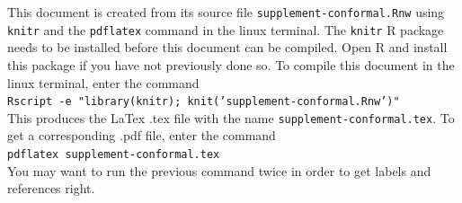 \documentclass[11pt]{article}\usepackage[]{graphicx}\usepackage[]{color}
\begin{document}
This document is created from its source file 
\texttt{supplement-conformal.Rnw} using \texttt{knitr} and the 
\texttt{pdflatex} command in the linux terminal. The \texttt{knitr} R package 
needs to be installed before this document can be compiled. Open R and install 
this package if you have not previously done so. To compile this document in 
the linux terminal, enter the command 
\vspace{0.25cm}\\
\texttt{Rscript -e "library(knitr); knit('supplement-conformal.Rnw')"} 
\vspace{0.25cm}\\
This produces the LaTex .tex file with the name 
\texttt{supplement-conformal.tex}. To get a corresponding .pdf file, enter 
the command
\vspace{0.25cm}\\
\texttt{pdflatex supplement-conformal.tex} 
\vspace{0.25cm}\\
You may want to run the previous command twice in order to get labels and 
references right.




\end{document}
